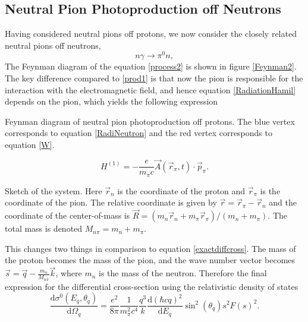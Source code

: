 \subsection{Neutral Pion Photoproduction off Neutrons}\label{sec:NoffN}
Having considered neutral pions off protons, we now consider the closely related neutral pions off neutrons,
\begin{equation} \label{process2}
	n\gamma \rightarrow \pi^0 n,
\end{equation}
The Feynman diagram of the equation \eqref{process2} is shown in figure \ref{Feynman2}. The key difference compared to \eqref{prod1} is that now the pion is responsible for the interaction with the electromagnetic field, and hence equation \eqref{RadiationHamil} depends on the pion, which yields the following expression
\begin{marginfigure}
	\centering
	
	\caption{Feynman diagram of neutral pion photoproduction off protons. The blue vertex corresponds to equation \eqref{RadiNeutron} and the red vertex corresponds to equation \eqref{W}.}
	\label{Feynman2}
\end{marginfigure} 
\begin{equation} \label{RadiNeutron}
	H^{(1)} = -\frac{e}{m_\pi c}\vec{A}(\vec{r}_\pi,t)\cdot\vec{p}_\pi.
\end{equation}
\begin{marginfigure}
	\centering
	
	\caption{Sketch of the system. Here $\vec{r}_n$ is the coordinate of the proton and $\vec{r}_\pi$ is the coordinate of the pion. The relative coordinate is given by $\vec{r}=\vec{r}_\pi-\vec{r}_n$ and the coordinate of the center-of-mass is $\vec{R}=(m_n \vec{r}_n+m_\pi\vec{r}_\pi)/(m_n+m_\pi)$. The total mass is denoted $M_{n\pi}=m_n+m_\pi$.}
	\label{JacobiIllustrationNeutron}
\end{marginfigure}
This changes two things in comparison to equation \eqref{exactdiffcross}. The mass of the proton becomes the mass of the pion, and the wave number vector becomes $\vec{s}=\vec{q}-\frac{m_n}{M_{n\pi}}\vec{k}$, where $m_n$ is the mass of the neutron. Therefore the final expression for the differential cross-section using the relativistic density of states 
\begin{equation} \label{totalcrossneutron}
	\frac{\text{d}\sigma^0(E_q,\theta_q)}{\text{d}\Omega_q} = \frac{e^2}{8\pi}\frac{1}{m_\pi^2c^4}\frac{q^3}{k}\frac{\text{d}(\hbar c q)^2}{\text{d}E_q}\sin^2(\theta_q) s^2 F(s)^2.
\end{equation}
